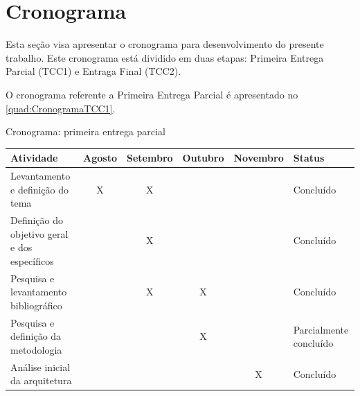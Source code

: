 \section{Cronograma}

Esta seção visa apresentar o cronograma para desenvolvimento do presente trabalho. Este
cronograma está dividido em duas etapas: Primeira Entrega Parcial (TCC1) e Entraga Final
(TCC2).

O cronograma referente a Primeira Entrega Parcial é apresentado no \autoref{quad:CronogramaTCC1}.

\begin{quadro}
    \caption{Cronograma: primeira entrega parcial\label{quad:CronogramaTCC1}}
    \begin{tabular}{ | m{4cm} | c | c | c | c | m{2.5cm} | }
    \hline
    \textbf{Atividade} &
        \textbf{Agosto} &
        \textbf{Setembro} &
        \textbf{Outubro} &
        \textbf{Novembro} &
        \textbf{Status} \\ \hline
    Levantamento e definição do tema &
        X &
        X &
        &
        &
        Concluído \\ \hline
    Definição do objetivo geral e dos específicos &
        &
        X &
        &
        &
        Concluído \\ \hline
    Pesquisa e levantamento bibliográfico &
        &
        X &
        X &
        &
        Concluído \\ \hline
    Pesquisa e definição da metodologia &
        &
        &
        X &
        &
        Parcialmente concluído \\ \hline
    Análise inicial da arquitetura &
        &
        &
        &
        X &
        Concluído \\ \hline
    \end{tabular}
\end{quadro}
